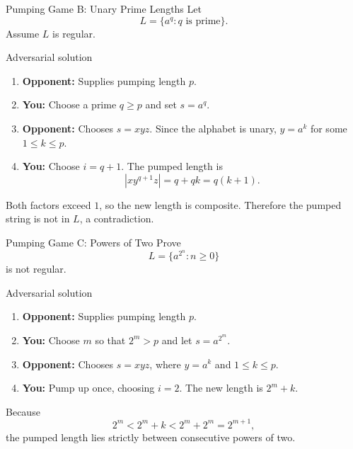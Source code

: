 \documentclass[10pt]{beamer}
\begin{document}
\begin{frame}{Pumping Game B: Unary Prime Lengths}
  \small
  Let
  \[
    L=\{a^q:q\text{ is prime}\}.
  \]
  Assume $L$ is regular.
  \begin{alertblock}{Adversarial solution}
    \begin{enumerate}
      \item \textbf{Opponent:} Supplies pumping length $p$.
      \item \textbf{You:} Choose a prime $q\ge p$ and set $s=a^q$.
      \item \textbf{Opponent:} Chooses $s=xyz$. Since the alphabet is unary,
        $y=a^k$ for some $1\le k\le p$.
      \item \textbf{You:} Choose $i=q+1$. The pumped length is
        \[
          |xy^{q+1}z|=q+qk=q(k+1).
        \]
    \end{enumerate}
  \end{alertblock}
  Both factors exceed $1$, so the new length is composite. Therefore the
  pumped string is not in $L$, a contradiction.
\end{frame}

\begin{frame}{Pumping Game C: Powers of Two}
  \small
  Prove
  \[
    L=\{a^{2^n}:n\ge0\}
  \]
  is not regular.
  \begin{alertblock}{Adversarial solution}
    \begin{enumerate}
      \item \textbf{Opponent:} Supplies pumping length $p$.
      \item \textbf{You:} Choose $m$ so that $2^m>p$ and let $s=a^{2^m}$.
      \item \textbf{Opponent:} Chooses $s=xyz$, where
        $y=a^k$ and $1\le k\le p$.
      \item \textbf{You:} Pump up once, choosing $i=2$. The new length is
        $2^m+k$.
    \end{enumerate}
  \end{alertblock}
  Because
  \[
    2^m<2^m+k<2^m+2^m=2^{m+1},
  \]
  the pumped length lies strictly between consecutive powers of two.
\end{frame}
\end{document}
